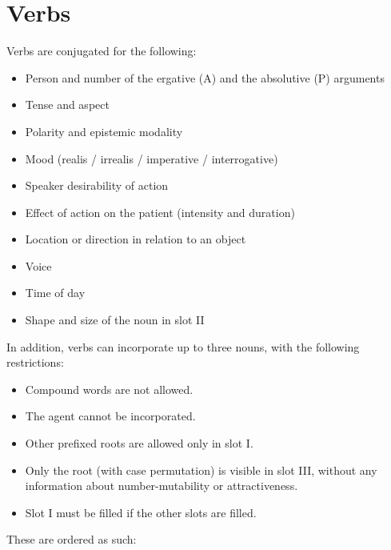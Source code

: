 \documentclass{book}
\begin{document}
\chapter{Verbs}

Verbs are conjugated for the following:

\begin{itemize}
  \item Person and number of the ergative (A) and the absolutive (P) arguments
  \item Tense and aspect
  \item Polarity and epistemic modality
  \item Mood (realis / irrealis / imperative / interrogative)
  \item Speaker desirability of action
  \item Effect of action on the patient (intensity and duration)
  \item Location or direction in relation to an object
  \item Voice
  \item Time of day
  \item Shape and size of the noun in slot II
\end{itemize}

In addition, verbs can incorporate up to three nouns, with the following restrictions:

\begin{itemize}
  \item Compound words are not allowed.
  \item The agent cannot be incorporated.
  \item Other prefixed roots are allowed only in slot I.
  \item Only the root (with case permutation) is visible in slot III, without any information about number-mutability or attractiveness.
  \item Slot I must be filled if the other slots are filled.
\end{itemize}

These are ordered as such:
\end{document}
